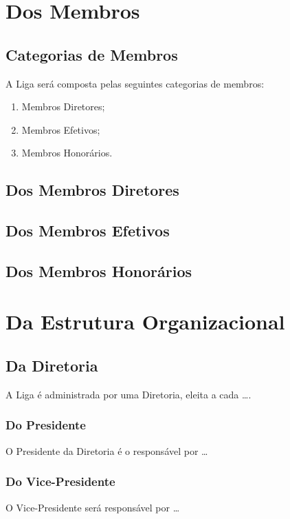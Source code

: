 \documentclass[11pt, a4paper]{article}
\begin{document}
\section{Dos Membros}
\label{sec:membros}

\subsection{Categorias de Membros}
A Liga será composta pelas seguintes categorias de membros:
\begin{enumerate}[label=Art. \arabic*.]
    \item Membros Diretores;
    \item Membros Efetivos;
    \item Membros Honorários.
\end{enumerate}

\subsection{Dos Membros Diretores}

\subsection{Dos Membros Efetivos}

\subsection{Dos Membros Honorários}

\section{Da Estrutura Organizacional}

\subsection{Da Diretoria}
A Liga é administrada por uma Diretoria, eleita a cada \dots.

\subsubsection{Do Presidente}
O Presidente da Diretoria é o responsável por \dots

\subsubsection{Do Vice-Presidente}
O Vice-Presidente será responsável por \dots
\end{document}
